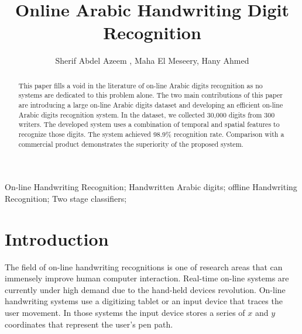 \documentclass[10pt]{IEEEtran}
\begin{document}
%
\title{Online Arabic Handwriting Digit Recognition}



\author{Sherif Abdel Azeem , Maha El Meseery, Hany Ahmed  \\

}


\maketitle


\begin{abstract}

This paper fills a void in the literature of on-line Arabic digits recognition as no systems are dedicated to this problem alone. The two main contributions of this paper are introducing a large on-line  Arabic digits dataset and developing an efficient on-line Arabic digits recognition system. In the dataset, we collected 30,000 digits from 300 writers. The developed system uses a combination of temporal and spatial features to recognize those digits. The system achieved 98.9\% recognition rate. Comparison with a commercial product demonstrates the superiority of the proposed system.

\end{abstract}

\begin{IEEEkeywords}
On-line Handwriting Recognition; Handwritten Arabic digits;  offline Handwriting Recognition; Two stage classifiers;
\end{IEEEkeywords}




\section{Introduction}
\label{sec:Introduction}
 The field of on-line handwriting recognitions is one of research areas that can immensely improve human computer interaction.  Real-time on-line systems are currently under high demand due to the hand-held devices revolution. On-line handwriting systems use a digitizing tablet or an input device that traces the user movement. In those systems the input device stores a series of $x$ and $y$ coordinates that represent the user's pen path.
\end{document}
